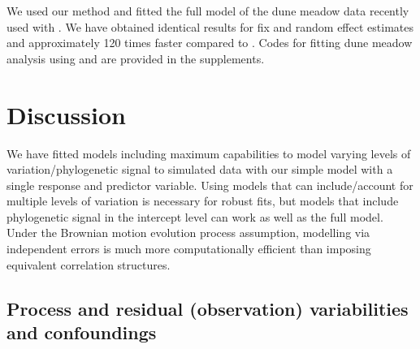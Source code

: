 

We used our method and fitted the full model of the dune meadow data recently used with  \cite{li2017canfun}. 
We have obtained identical results for fix and random effect estimates and approximately 120 times faster compared to . 
Codes for fitting dune meadow analysis using  and  are provided in the supplements. 

\newpage

\section{Discussion}

We have fitted models including maximum capabilities  to model varying levels of variation/phylogenetic signal to simulated data with our simple model with a single response and predictor variable.
Using models that can include/account for multiple levels of variation is necessary for robust fits, but models that include phylogenetic signal in the intercept level can work as well as the full model. 
Under the Brownian motion evolution process assumption, modelling via independent errors is much more computationally efficient than imposing equivalent correlation structures. 

\subsection{Process and residual (observation) variabilities and confoundings}

